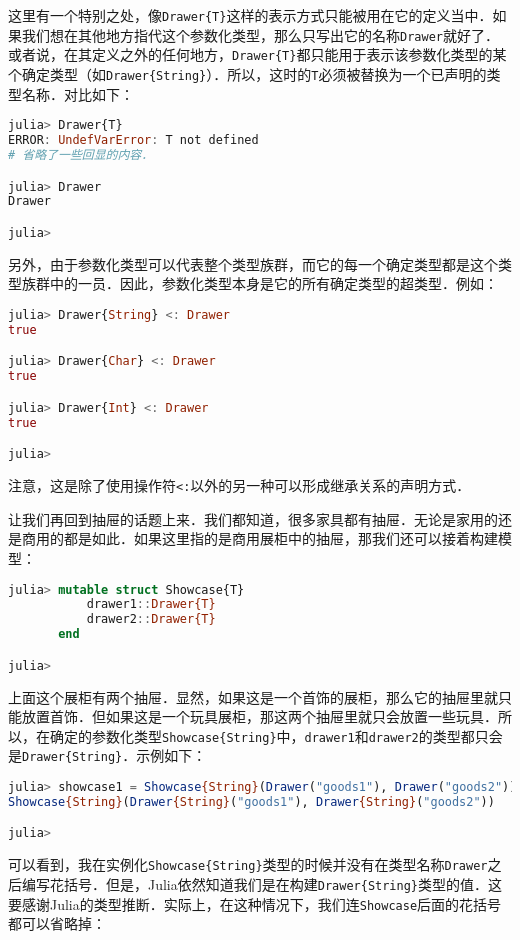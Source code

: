 这里有一个特别之处，像\verb|Drawer{T}|这样的表示方式只能被用在它的定义当中．如果我们想在其他地方指代这个参数化类型，那么只写出它的名称\verb|Drawer|就好了．或者说，在其定义之外的任何地方，\verb|Drawer{T}|都只能用于表示该参数化类型的某个确定类型（如\verb|Drawer{String}|）．所以，这时的\verb|T|必须被替换为一个已声明的类型名称．对比如下：
\begin{lstlisting}[language=julia]
julia> Drawer{T} 
ERROR: UndefVarError: T not defined
# 省略了一些回显的内容．

julia> Drawer
Drawer

julia> 
\end{lstlisting}

另外，由于参数化类型可以代表整个类型族群，而它的每一个确定类型都是这个类型族群中的一员．因此，参数化类型本身是它的所有确定类型的超类型．例如：
\begin{lstlisting}[language=julia]
julia> Drawer{String} <: Drawer
true

julia> Drawer{Char} <: Drawer
true

julia> Drawer{Int} <: Drawer
true

julia> 
\end{lstlisting}

注意，这是除了使用操作符\verb|<:|以外的另一种可以形成继承关系的声明方式．

让我们再回到抽屉的话题上来．我们都知道，很多家具都有抽屉．无论是家用的还是商用的都是如此．如果这里指的是商用展柜中的抽屉，那我们还可以接着构建模型：
\begin{lstlisting}[language=julia]
julia> mutable struct Showcase{T}
           drawer1::Drawer{T}
           drawer2::Drawer{T}
       end

julia> 
\end{lstlisting}

上面这个展柜有两个抽屉．显然，如果这是一个首饰的展柜，那么它的抽屉里就只能放置首饰．但如果这是一个玩具展柜，那这两个抽屉里就只会放置一些玩具．所以，在确定的参数化类型\verb|Showcase{String}|中，\verb|drawer1|和\verb|drawer2|的类型都只会是\verb|Drawer{String}|．示例如下：

\begin{lstlisting}[language=julia]
julia> showcase1 = Showcase{String}(Drawer("goods1"), Drawer("goods2"))
Showcase{String}(Drawer{String}("goods1"), Drawer{String}("goods2"))

julia> 
\end{lstlisting}

可以看到，我在实例化\verb|Showcase{String}|类型的时候并没有在类型名称\verb|Drawer|之后编写花括号．但是，Julia依然知道我们是在构建\verb|Drawer{String}|类型的值．这要感谢Julia的类型推断．实际上，在这种情况下，我们连\verb|Showcase|后面的花括号都可以省略掉：

